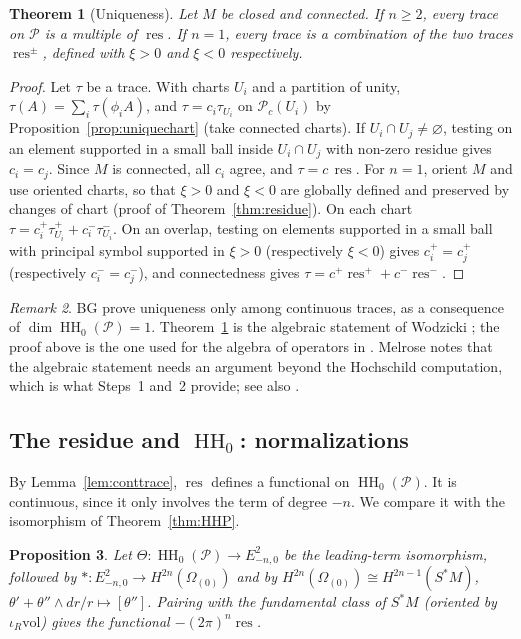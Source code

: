 \documentclass[11pt,oneside,reqno]{article}
\DeclareMathOperator{\HH}{HH}
\DeclareMathOperator{\res}{res}
\newcommand{\cP}{\mathcal P}
\newcommand{\Om}{\Omega}
\newcommand{\vol}{\mathrm{vol}}
\theoremstyle{plain}
\newtheorem{theorem}{Theorem}[section]
\newtheorem{proposition}[theorem]{Proposition}
\theoremstyle{definition}
\theoremstyle{remark}
\newtheorem{remark}[theorem]{Remark}
\begin{document}
\begin{theorem}[Uniqueness]\label{thm:unique}
Let \(M\) be closed and connected. If \(n\ge2\), every trace on \(\cP\) is a multiple of \(\res\). If
\(n=1\), every trace is a combination of the two traces \(\res^\pm\), defined with \(\xi>0\) and
\(\xi<0\) respectively.
\end{theorem}

\begin{proof}
Let \(\tau\) be a trace. With charts \(U_i\) and a partition of unity, \(\tau(A)=\sum_i\tau(\phi_iA)\),
and \(\tau=c_i\tau_{U_i}\) on \(\cP_c(U_i)\) by Proposition~\ref{prop:uniquechart} (take connected
charts). If \(U_i\cap U_j\ne\varnothing\), testing on an element supported in a small ball
inside \(U_i\cap U_j\) with non-zero residue gives \(c_i=c_j\). Since \(M\) is connected, all
\(c_i\) agree, and \(\tau=c\,\res\). For \(n=1\), orient \(M\) and use oriented charts, so that
\(\xi>0\) and \(\xi<0\) are globally defined and preserved by changes of chart (proof of
Theorem~\ref{thm:residue}). On each chart \(\tau=c^+_i\tau^+_{U_i}+c^-_i\tau^-_{U_i}\). On an overlap,
testing on elements supported in a small ball with principal symbol supported in
\(\xi>0\) (respectively \(\xi<0\)) gives \(c^+_i=c^+_j\) (respectively \(c^-_i=c^-_j\)), and
connectedness gives \(\tau=c^+\res^++c^-\res^-\).
\end{proof}

\begin{remark}
BG prove uniqueness only among continuous traces, as a consequence of
\(\dim\HH_0(\cP)=1\). Theorem~\ref{thm:unique} is the algebraic statement of Wodzicki
\cite{Wodzicki-residue}; the proof above is the one used for the algebra of
operators in \cite{MN}. Melrose \cite[Ch.~10]{MelroseMicro} notes that the
algebraic statement needs an argument beyond the Hochschild computation, which
is what Steps~1 and~2 provide; see also \cite{LeschNeira}.
\end{remark}

\subsection{The residue and \texorpdfstring{\(\HH_0\)}{HH0}: normalizations}\label{subsec:resHH0}
By Lemma~\ref{lem:conttrace}, \(\res\) defines a functional on \(\HH_0(\cP)\). It is
continuous, since it only involves the term of degree \(-n\). We compare it with the
isomorphism of Theorem~\ref{thm:HHP}.

\begin{proposition}\label{prop:resTheta}
Let \(\Theta:\HH_0(\cP)\to E^2_{-n,0}\) be the leading-term isomorphism, followed by
\(*:E^2_{-n,0}\to H^{2n}(\Om_{(0)})\) and by \(H^{2n}(\Om_{(0)})\cong H^{2n-1}(S^*M)\),
\(\theta'+\theta''\wedge dr/r\mapsto[\theta'']\). Pairing with the fundamental class of \(S^*M\)
(oriented by \(\iota_R\vol\)) gives the functional \(-(2\pi)^n\res\).
\end{proposition}
\end{document}
